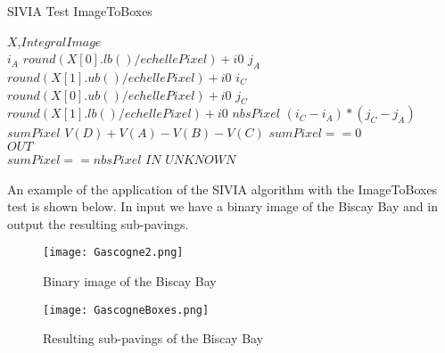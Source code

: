 \begin{algorithm}[H]
\caption{SIVIA Test ImageToBoxes}
\label{alg:one_boat_alg}
\begin{algorithmic}[1]
\REQUIRE $X$,$IntegralImage$\\
$i_A$ \gets \textnormal{$round(X[0].lb()/echellePixel) + i0$}
$j_A$ \gets \textnormal{$round(X[1].ub()/echellePixel) + i0$}
$i_C$ \gets \textnormal{$round(X[0].ub()/echellePixel) + i0$}
$j_C$ \gets \textnormal{$round(X[1].lb()/echellePixel) + i0$}
$nbsPixel$ \gets \textnormal{$(i_C - i_A) * (j_C - j_A)$}
$sumPixel$ \gets \textnormal{$V(D) + V(A) - V(B) - V(C)$}
\IF \textnormal{$sumPixel == 0$}\\
\RETURN \textnormal{$OUT$}\\
\ELSIF \textnormal{$sumPixel == nbsPixel$} 
\RETURN \textnormal{$IN$}
\ELSE
\RETURN \textnormal{$UNKNOWN$}
\ENDIF
\end{algorithmic}
\end{algorithm}

\vspace{1cm}
An example of the application of the SIVIA algorithm with the ImageToBoxes test is shown below. In input we have a binary image of the Biscay Bay and in output the resulting sub-pavings.
\begin{figure}[H]
\centering
    \begin{minipage}[b]{0.4\textwidth}
    \texttt{[image: Gascogne2.png]}
	\caption{Binary image of the Biscay Bay } 
	\label{fig: Biscay Bay}
    \end{minipage}
    \begin{minipage}[b]{0.4\textwidth}
    \texttt{[image: GascogneBoxes.png]} 
	\caption{Resulting sub-pavings of the Biscay Bay } 
	\label{fig: Sub-pavings of the Biscay Bay}
    \end{minipage}
\end{figure}

